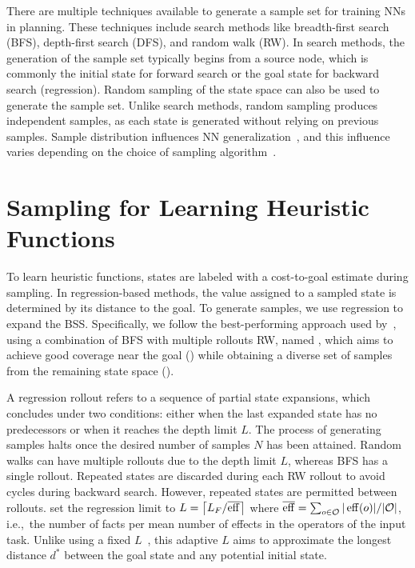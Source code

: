 \documentclass[ppgc,diss,english]{iiufrgs}
\providecommand{\ceil}[1]{\ensuremath{\left\lceil #1\right\rceil}}
\begin{document}
There are multiple techniques available to generate a sample set for training NNs in planning. These techniques include search methods like breadth-first search (BFS), depth-first search (DFS), and random walk (RW). In search methods, the generation of the sample set typically begins from a source node, which is commonly the initial state for forward search or the goal state for backward search (regression). Random sampling of the state space can also be used to generate the sample set. Unlike search methods, random sampling produces independent samples, as each state is generated without relying on previous samples. Sample distribution influences NN generalization~\cite{Ferber.etal/2020a}, and this influence varies depending on the choice of sampling algorithm~\cite{Bettker.etal/2022}.

\section{Sampling for Learning Heuristic Functions}
\label{sec:sample-learn-h}
To learn heuristic functions, states are labeled with a cost-to-goal estimate during sampling. In regression-based methods, the value assigned to a sampled state is determined by its distance to the goal. To generate samples, we use regression to expand the BSS. Specifically, we follow the best-performing approach used by~\citet{Bettker.etal/2022}, using a combination of BFS with multiple rollouts RW, named \bfsrw, which aims to achieve good coverage near the goal (\bfs) while obtaining a diverse set of samples from the remaining state space (\rw).

A regression rollout refers to a sequence of partial state expansions, which concludes under two conditions: either when the last expanded state has no predecessors or when it reaches the depth limit $L$. The process of generating samples halts once the desired number of samples $N$ has been attained. Random walks can have multiple rollouts due to the depth limit $L$, whereas BFS has a single rollout. Repeated states are discarded during each RW rollout to avoid cycles during backward search. However, repeated states are permitted between rollouts.
\citet{Bettker.etal/2022} set the regression limit to $L=\ceil{\facts/\overline{\eff}}$ where $\overline{\operatorname{eff}}=\sum_{o\in \mathcal{O}} |\operatorname{eff}(o)|/|\mathcal{O}|$, i.e.,~the number of facts per mean number of effects in the operators of the input task. Unlike using a fixed $L$~\cite{Yu.etal/2020, OToole/2022}, this adaptive $L$ aims to approximate the longest distance $d^{*}$ between the goal state and any potential initial state.
\end{document}
